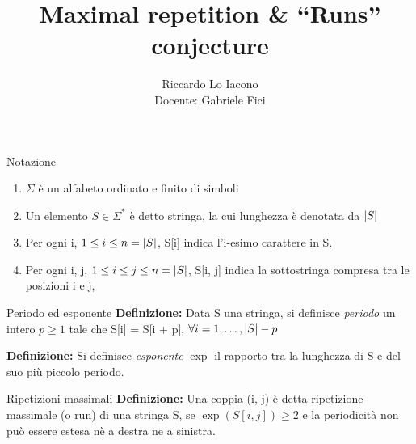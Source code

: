 \documentclass{beamer}
\title{Maximal repetition \& ``Runs'' conjecture}
\author{Riccardo Lo Iacono \\ \footnotesize{Docente: Gabriele Fici}}
\begin{document}
    \begin{frame}
        \maketitle
    \end{frame}
    \begin{frame}{Notazione}
        \begin{enumerate}
            \item \(\Sigma\) è un alfabeto ordinato e finito di simboli
            \item Un elemento \(S \in \Sigma^{*}\) è detto stringa,
                la cui lunghezza è denotata da \(\left\lvert S \right\rvert\)
            \item Per ogni i, \(1 \le i \le n = \left\lvert S \right\rvert\), 
                S[i] indica l'i-esimo carattere in S.
            \item Per ogni i, j, \(1 \le i \le j \le n = \left\lvert S \right\rvert\),
                S[i, j] indica la sottostringa compresa tra le 
                posizioni i e j, 
        \end{enumerate}
    \end{frame}
    \begin{frame}{Periodo ed esponente}
        \textbf{Definizione: } Data S una stringa,
        si definisce \emph{periodo} un intero \(p \ge 1\)
        tale che S[i] = S[i + p], \(\forall i = 1, \ldots, \left\lvert S \right\rvert - p\)

        \textbf{Definizione: } Si definisce \emph{esponente} \(\exp\)
        il rapporto tra la lunghezza di S e del suo più piccolo periodo.
    \end{frame}
    \begin{frame}{Ripetizioni massimali}
        \textbf{Definizione: } Una coppia (i, j) è detta ripetizione massimale
        (o run) di una stringa S, se \(\exp(S[i, j]) \ge 2\) e la periodicità
        non può essere estesa nè a destra ne a sinistra.
    \end{frame}
\end{document}
